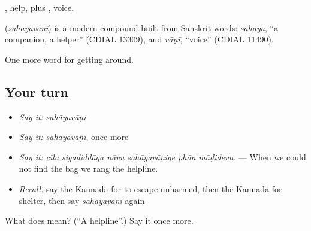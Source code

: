 , help, plus , voice.

\begin{cousinweb}
\textbf{} (\emph{sahāyavāṇi}) is a modern compound built from Sanskrit words: \emph{sahāya}, \textquotedblleft{}a companion, a helper\textquotedblright{} (CDIAL 13309), and \emph{vāṇī}, \textquotedblleft{}voice\textquotedblright{} (CDIAL 11490).
\end{cousinweb}

\begin{grammarlens}[title={What you've built}]
One more word for getting around.
\end{grammarlens}

\subsection*{Your turn}
\begin{itemize}
\raggedright
  \item \emph{Say it:} \emph{sahāyavāṇi}
  \item \emph{Say it:} \emph{sahāyavāṇi}, once more
  \item \emph{Say it:} \emph{cīla sigadiddāga nāvu sahāyavāṇige phōn māḍidevu.} — When we could not find the bag we rang the helpline.
  \item \emph{Recall:} say the Kannada for to escape unharmed, then the Kannada for shelter, then say \emph{sahāyavāṇi} again
\end{itemize}

\begin{tcolorbox}[breakable,colback=teal!4,colframe=teal!35!black,title={Before you move on}]
What does  mean? (\textquotedblleft{}A helpline\textquotedblright{}.) Say it once more.
\end{tcolorbox}

